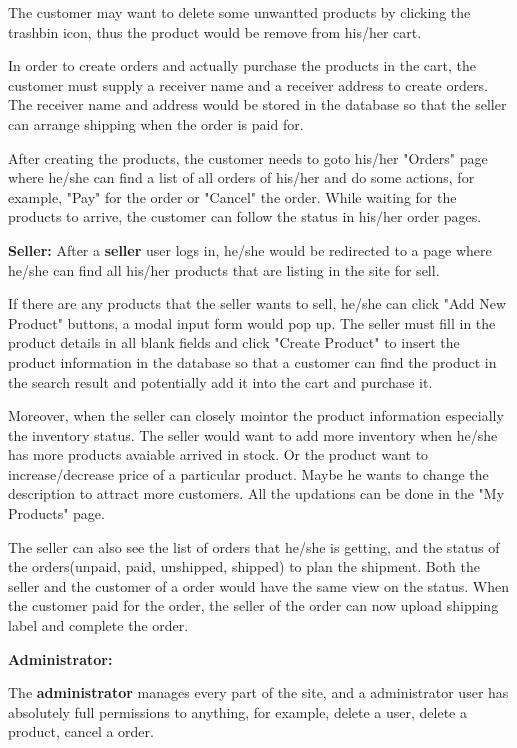 \documentclass[12pt]{article}
\begin{document}
The customer may want to delete some unwantted products by clicking the trashbin icon, thus the product would be
remove from his/her cart.

In order to create orders and actually purchase the products in the cart, the customer must supply a receiver name
and a receiver address to create orders. The receiver name and address would be stored in the database so that the seller can arrange shipping when the order
is paid for.

After creating the products, the customer needs to goto his/her "Orders" page where he/she can find a list of all orders of his/her and do
some actions, for example, "Pay" for the order or "Cancel" the order. While waiting for the products to arrive, the customer can follow the status in his/her
order pages.

\vspace*{5mm}
\textbf{Seller:} After a \textbf{seller} user logs in, he/she would be redirected to a page where he/she can find
all his/her products that are listing in the site for sell.

If there are any products that the seller wants to sell,
he/she can click "Add New Product" buttons, a modal input form would pop up. The seller must fill in the product details
in all blank fields and click "Create Product" to insert the product information in the database so that a customer can find
the product in the search result and potentially add it into the cart and purchase it.

Moreover, when the seller can closely mointor the product information especially the inventory status. The seller would want
to add more inventory when he/she has more products avaiable arrived in stock. Or the product want to increase/decrease price of a
particular product. Maybe he wants to change the description to attract more customers. All the updations can be done in the "My Products" page.

The seller can also see the list of orders that he/she is getting, and the status of the orders(unpaid, paid, unshipped, shipped) to plan the shipment.
Both the seller and the customer of a order would have the same view on the status. When the customer paid for the order, the seller of the
order can now upload shipping label and complete the order.


\vspace*{5mm}
\textbf{Administrator:}

The \textbf{administrator} manages every part of the site, and a administrator user has absolutely full permissions to anything, for example, delete
a user, delete a product, cancel a order.
\end{document}
